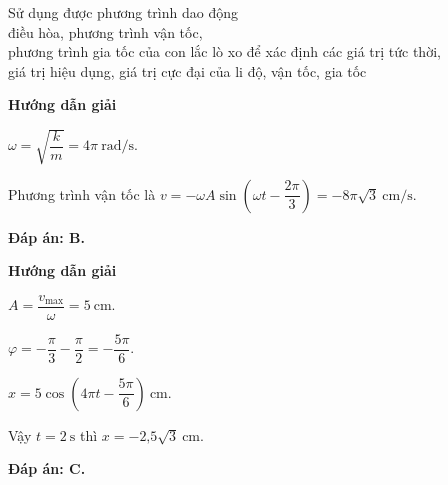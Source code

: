 \begin{dang}{Sử dụng được phương trình dao động\\ điều hòa, phương trình vận tốc,\\ phương trình gia tốc của con lắc lò xo để xác định các giá trị tức thời,\\ giá trị hiệu dụng, giá trị cực đại của li độ, vận tốc, gia tốc}
	
	{\begin{center}
			\textbf{Hướng dẫn giải}
		\end{center}
		
		$\omega=\sqrt{\dfrac{k}{m}}=4\pi\ \text{rad/s}$.
		
		Phương trình vận tốc là $v=-\omega A \sin \left(\omega  t-\dfrac{2\pi}{3} \right)=-8\pi\sqrt{3}\ \text{cm/s}  $.
		
		\textbf{Đáp án: B.}
	}
	{\begin{center}
			\textbf{Hướng dẫn giải}
		\end{center}
		
		$A=\dfrac{v_\text{max}}{\omega}=5\ \text{cm}$.
		
		$\varphi=-\dfrac{\pi}{3}-\dfrac{\pi}{2}=-\dfrac{5\pi}{6}$.
		
		$x=5\cos \left(4\pi t -\dfrac{5\pi}{6}\right)\ \text{cm}$.
		
		Vậy $t=2\ \text{s}$ thì $x=-\text{2,5}\sqrt{3}\ \text{cm}$.
		
		\textbf{Đáp án: C.}
	}
	
	
\end{dang}
